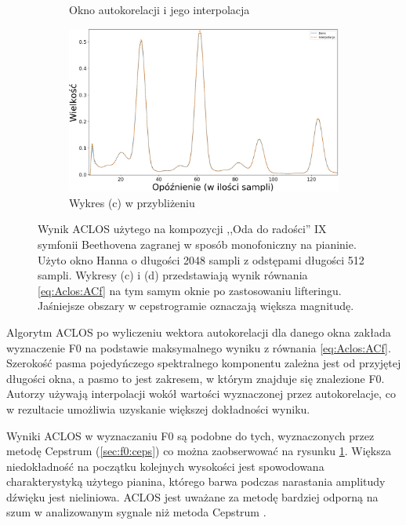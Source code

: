 \documentclass[12pt,a4paper,twoside]{mwart}
\begin{document}
\begin{figure}[ht]
\begin{subfigure}{0.5\textwidth}
    \caption{Okno autokorelacji i jego interpolacja}
  \end{subfigure}
  \begin{subfigure}{0.49\textwidth}
    \centering
    \includegraphics[width=1.\linewidth]{images/ACLOS/Interpolacja_superzoomed_cropped.png}
    \caption{Wykres (c) w przybliżeniu}
  \end{subfigure}
  \caption{Wynik ACLOS użytego na kompozycji ,,Oda do radości'' IX symfonii Beethovena zagranej w sposób monofoniczny na pianinie. Użyto okno Hanna o długości 2048 sampli z odstępami długości 512 sampli. Wykresy (c) i (d) przedstawiają wynik równania \ref{eq:Aclos:ACf} na tym samym oknie po zastosowaniu lifteringu. Jaśniejsze obszary w cepstrogramie oznaczają większa magnitudę.}
  \label{fig:aclos:results}
\end{figure}

Algorytm ACLOS po wyliczeniu wektora autokorelacji dla danego okna zakłada wyznaczenie F0 na podstawie maksymalnego wyniku z równania \ref{eq:Aclos:ACf}. Szerokość pasma pojedyńczego spektralnego komponentu zależna jest od przyjętej długości okna, a pasmo to jest zakresem, w którym znajduje się znalezione F0. Autorzy używają interpolacji wokół wartości wyznaczonej przez autokorelacje, co w rezultacie umożliwia uzyskanie większej dokładności wyniku.

Wyniki ACLOS w wyznaczaniu F0 są podobne do tych, wyznaczonych przez metodę Cepstrum (\ref{sec:f0:ceps}) co można zaobserwować na rysunku \ref{fig:aclos:results}. Większa niedokładność na początku kolejnych wysokości jest spowodowana charakterystyką użytego pianina, którego barwa podczas narastania amplitudy dźwięku jest nieliniowa. ACLOS jest uważane za metodę bardziej odporną na szum w analizowanym sygnale niż metoda Cepstrum \cite{Transcription:Kunieda:Aclos}.
\end{document}
